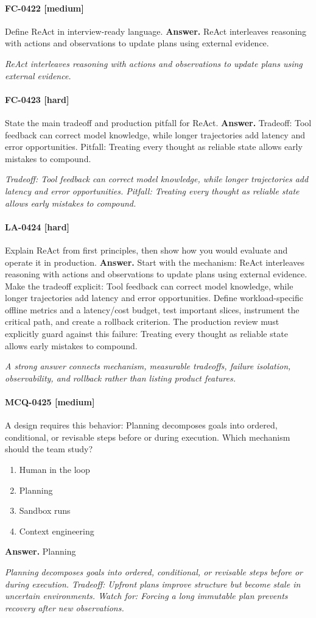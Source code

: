 \paragraph{FC-0422 [medium]} Define ReAct in interview-ready language.
\noindent\textbf{Answer.} ReAct interleaves reasoning with actions and observations to update plans using external evidence.
\par\textit{ReAct interleaves reasoning with actions and observations to update plans using external evidence.}
\paragraph{FC-0423 [hard]} State the main tradeoff and production pitfall for ReAct.
\noindent\textbf{Answer.} Tradeoff: Tool feedback can correct model knowledge, while longer trajectories add latency and error opportunities. Pitfall: Treating every thought as reliable state allows early mistakes to compound.
\par\textit{Tradeoff: Tool feedback can correct model knowledge, while longer trajectories add latency and error opportunities. Pitfall: Treating every thought as reliable state allows early mistakes to compound.}
\paragraph{LA-0424 [hard]} Explain ReAct from first principles, then show how you would evaluate and operate it in production.
\noindent\textbf{Answer.} Start with the mechanism: ReAct interleaves reasoning with actions and observations to update plans using external evidence. Make the tradeoff explicit: Tool feedback can correct model knowledge, while longer trajectories add latency and error opportunities. Define workload-specific offline metrics and a latency/cost budget, test important slices, instrument the critical path, and create a rollback criterion. The production review must explicitly guard against this failure: Treating every thought as reliable state allows early mistakes to compound.
\par\textit{A strong answer connects mechanism, measurable tradeoffs, failure isolation, observability, and rollback rather than listing product features.}
\paragraph{MCQ-0425 [medium]} A design requires this behavior: Planning decomposes goals into ordered, conditional, or revisable steps before or during execution. Which mechanism should the team study?
\begin{enumerate}[label=\Alph*.]
\item Human in the loop
\item Planning
\item Sandbox runs
\item Context engineering
\end{enumerate}
\noindent\textbf{Answer.} Planning
\par\textit{Planning decomposes goals into ordered, conditional, or revisable steps before or during execution. Tradeoff: Upfront plans improve structure but become stale in uncertain environments. Watch for: Forcing a long immutable plan prevents recovery after new observations.}
